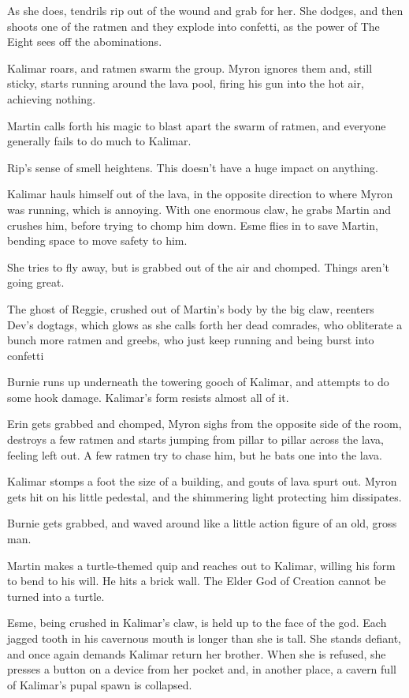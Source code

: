 As she does, tendrils rip out of the wound and grab for her. She dodges, and then shoots one of the ratmen and they explode into confetti, as the power of The Eight sees off the abominations.\medskip

Kalimar roars, and ratmen swarm the group. Myron ignores them and, still sticky, starts running around the lava pool, firing his gun into the hot air, achieving nothing.\medskip

Martin calls forth his magic to blast apart the swarm of ratmen, and everyone generally fails to do much to Kalimar.\medskip

Rip’s sense of smell heightens. This doesn’t have a huge impact on anything.\medskip

Kalimar hauls himself out of the lava, in the opposite direction to where Myron was running, which is annoying. With one enormous claw, he grabs Martin and crushes him, before trying to chomp him down. Esme flies in to save Martin, bending space to move safety to him.\medskip

She tries to fly away, but is grabbed out of the air and chomped. Things aren’t going great.\medskip

The ghost of Reggie, crushed out of Martin’s body by the big claw, reenters Dev’s dogtags, which glows as she calls forth her dead comrades, who obliterate a bunch more ratmen and greebs, who just keep running and being burst into confetti\medskip

Burnie runs up underneath the towering gooch of Kalimar, and attempts to do some hook damage. Kalimar’s form resists almost all of it.\medskip

Erin gets grabbed and chomped, Myron sighs from the opposite side of the room, destroys a few ratmen and starts jumping from pillar to pillar across the lava, feeling left out. A few ratmen try to chase him, but he bats one into the lava.\medskip

Kalimar stomps a foot the size of a building, and gouts of lava spurt out. Myron gets hit on his little pedestal, and the shimmering light protecting him dissipates.\medskip

Burnie gets grabbed, and waved around like a little action figure of an old, gross man.\medskip

Martin makes a turtle-themed quip and reaches out to Kalimar, willing his form to bend to his will. He hits a brick wall. The Elder God of Creation cannot be turned into a turtle.\medskip

Esme, being crushed in Kalimar’s claw, is held up to the face of the god. Each jagged tooth in his cavernous mouth is longer than she is tall. She stands defiant, and once again demands Kalimar return her brother. When she is refused, she presses a button on a device from her pocket and, in another place, a cavern full of Kalimar’s pupal spawn is collapsed.\medskip

